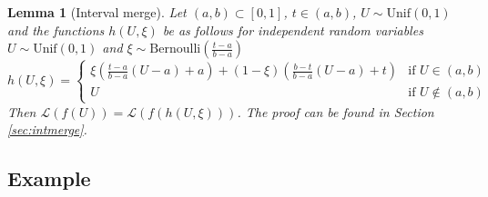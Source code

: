 \documentclass[12pt]{article}
\theoremstyle{plain}%
\newtheorem{lemma}[theorem]{Lemma}
\theoremstyle{definition}
\def\unif{\mathrm{Unif}}
\begin{document}
\begin{lemma}[Interval merge]\label{lem:intmerge}
	Let $(a,b)\subset [0,1]$, $t\in (a,b)$, $U\sim \unif (0,1)$ and the functions $h(U,\xi)$ be as follows for independent random variables $U\sim \unif (0,1)$ and $\xi\sim \mathrm{Bernoulli}(\frac{t-a}{b-a})$
	\begin{equation}\label{eq:h}
		h(U,\xi)=
		\begin{cases}
			\xi \left(\frac{t-a}{b-a}(U-a)+a\right) + (1-\xi) \left(\frac{b-t}{b-a}(U-a)+t\right) & \text{if } U\in (a,b)\\
			U & \text{if } U\notin (a,b)
		\end{cases}
	\end{equation}
	Then $\mathcal{L}(f(U))=\mathcal{L}(f(h(U,\xi)))$.
	The proof can be found in Section \ref{sec:intmerge}.
\end{lemma}

\subsection{Example}\label{subsec:ranlogmap2}
\end{document}
